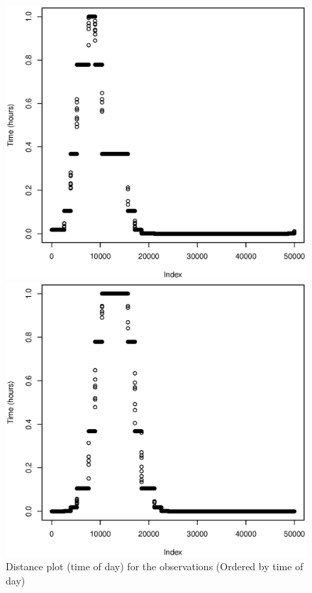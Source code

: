 \documentclass[a4paper, 12pt]{article}
\begin{document}
    \begin{figure}[H]
    \centering
    \caption{Distance plot (time of day) for the observations (Ordered by time of day) \label{fig:time}}
	    \begin{minipage}[]{0.2\textwidth}
	    	\includegraphics[width=\textwidth]{share/1_time.eps}
	    \end{minipage}
	    \begin{minipage}[]{0.2\textwidth}
	    	\includegraphics[width=\textwidth]{share/2_time.eps}

\end{minipage}
\end{figure}
\end{document}
